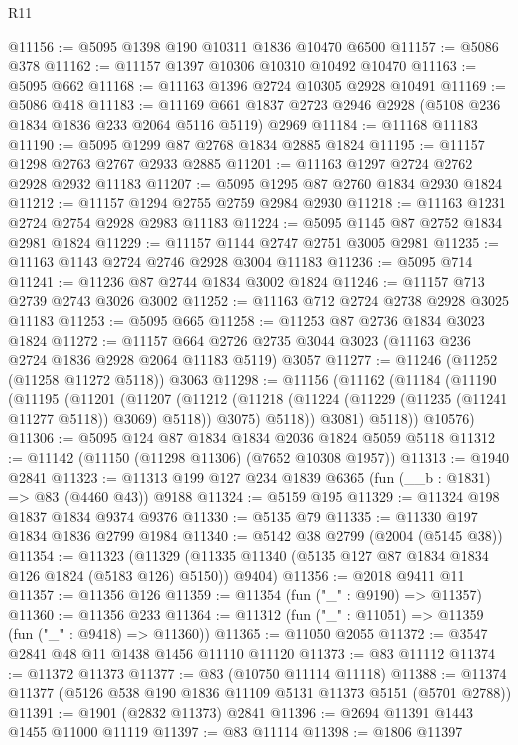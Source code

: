 \begin{lexlean}{R11}
\begin{coremodule}
@11156 := @5095 @1398 @190 @10311 @1836 @10470 @6500
@11157 := @5086 @378
@11162 := @11157 @1397 @10306 @10310 @10492 @10470
@11163 := @5095 @662
@11168 := @11163 @1396 @2724 @10305 @2928 @10491
@11169 := @5086 @418
@11183 := @11169 @661 @1837 @2723 @2946 @2928 (@5108 @236 @1834 @1836 @233 @2064 @5116 @5119) @2969
@11184 := @11168 @11183
@11190 := @5095 @1299 @87 @2768 @1834 @2885 @1824
@11195 := @11157 @1298 @2763 @2767 @2933 @2885
@11201 := @11163 @1297 @2724 @2762 @2928 @2932 @11183
@11207 := @5095 @1295 @87 @2760 @1834 @2930 @1824
@11212 := @11157 @1294 @2755 @2759 @2984 @2930
@11218 := @11163 @1231 @2724 @2754 @2928 @2983 @11183
@11224 := @5095 @1145 @87 @2752 @1834 @2981 @1824
@11229 := @11157 @1144 @2747 @2751 @3005 @2981
@11235 := @11163 @1143 @2724 @2746 @2928 @3004 @11183
@11236 := @5095 @714
@11241 := @11236 @87 @2744 @1834 @3002 @1824
@11246 := @11157 @713 @2739 @2743 @3026 @3002
@11252 := @11163 @712 @2724 @2738 @2928 @3025 @11183
@11253 := @5095 @665
@11258 := @11253 @87 @2736 @1834 @3023 @1824
@11272 := @11157
    @664
    @2726
    @2735
    @3044
    @3023
    (@11163 @236 @2724 @1836 @2928 @2064 @11183 @5119)
    @3057
@11277 := @11246 (@11252 (@11258 @11272 @5118)) @3063
@11298 := @11156
    (@11162
      (@11184
        (@11190
          (@11195
            (@11201
              (@11207
                (@11212 (@11218 (@11224 (@11229 (@11235 (@11241 @11277 @5118)) @3069) @5118)) @3075)
                @5118))
            @3081)
          @5118))
      @10576)
@11306 := @5095 @124 @87 @1834 @1834 @2036 @1824 @5059 @5118
@11312 := @11142 (@11150 (@11298 @11306) (@7652 @10308 @1957))
@11313 := @1940 @2841
@11323 := @11313 @199 @127 @234 @1839 @6365 (fun (__b : @1831) => @83 (@4460 @43)) @9188
@11324 := @5159 @195
@11329 := @11324 @198 @1837 @1834 @9374 @9376
@11330 := @5135 @79
@11335 := @11330 @197 @1834 @1836 @2799 @1984
@11340 := @5142 @38 @2799 (@2004 (@5145 @38))
@11354 := @11323
    (@11329 (@11335 @11340 (@5135 @127 @87 @1834 @1834 @126 @1824 (@5183 @126) @5150)) @9404)
@11356 := @2018 @9411 @11
@11357 := @11356 @126
@11359 := @11354 (fun ("_" : @9190) => @11357)
@11360 := @11356 @233
@11364 := @11312 (fun ("_" : @11051) => @11359 (fun ("_" : @9418) => @11360))
@11365 := @11050 @2055
@11372 := @3547 @2841 @48 @11 @1438 @1456 @11110 @11120
@11373 := @83 @11112
@11374 := @11372 @11373
@11377 := @83 (@10750 @11114 @11118)
@11388 := @11374 @11377 (@5126 @538 @190 @1836 @11109 @5131 @11373 @5151 (@5701 @2788))
@11391 := @1901 (@2832 @11373) @2841
@11396 := @2694 @11391 @1443 @1455 @11000 @11119
@11397 := @83 @11114
@11398 := @1806 @11397

\end{coremodule}
\end{lexlean}
